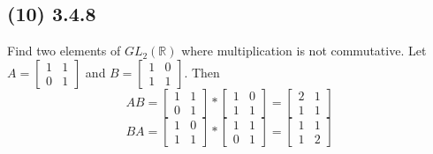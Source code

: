 \documentclass{article}
\begin{document}
\subsection*{(10) 3.4.8}
Find two elements of $GL_2(\mathbb{R})$ where multiplication is not commutative.
Let $A = \begin{bmatrix}
    1 &1\\0&1
\end{bmatrix}$
and $B = \begin{bmatrix}
    1&0\\1&1
\end{bmatrix}$.
Then
\[ AB = \begin{bmatrix}
    1 &1\\0&1
\end{bmatrix} * \begin{bmatrix}
    1&0\\1&1
\end{bmatrix} = 
\begin{bmatrix} 2&1\\1&1 \end{bmatrix} \]
\[BA = \begin{bmatrix}
    1&0\\1&1
\end{bmatrix} * \begin{bmatrix}
    1 &1\\0&1
\end{bmatrix} = 
\begin{bmatrix} 1&1\\1&2 \end{bmatrix} \]
\end{document}
